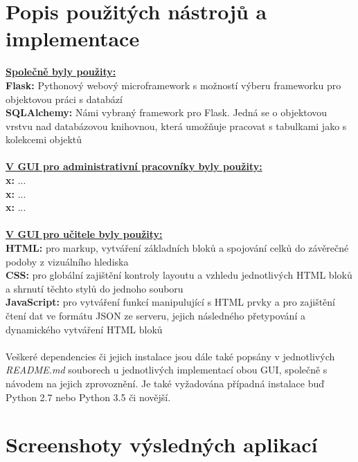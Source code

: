 \documentclass[a4paper, 11pt, twocolumn]{article}
\begin{document}
	\vspace*{\fill}
	\clearpage


	\section*{\large{Popis použitých nástrojů a implementace}}
	\vspace*{-0.2cm}
	\vspace*{0.3cm}
	\noindent\textbf{\underline{Společně byly použity: }} \\
	\noindent\textbf{Flask: } Pythonový webový microframework s možností výberu frameworku pro objektovou práci s databází \\
	\noindent\textbf{SQLAlchemy: } Námi vybraný framework pro Flask. Jedná se o objektovou vrstvu nad databázovou knihovnou, která umožňuje pracovat s 
	tabulkami jako s kolekcemi objektů \\
	\vspace*{0.5cm} \\
	\noindent\textbf{\underline{V GUI pro administrativní pracovníky byly použity: }} \\
	\noindent\textbf{x: } ... \\
	\noindent\textbf{x: } ... \\
	\noindent\textbf{x: } ... \\
	\vspace*{0.5cm} \\
	\noindent\textbf{\underline{V GUI pro učitele byly použity: }} \\
	\noindent\textbf{HTML: } pro markup, vytváření základních bloků a spojování celků do závěrečné podoby z vizuálního hlediska \\
	\noindent\textbf{CSS: } pro globální zajištění kontroly layoutu a vzhledu jednotlivých HTML bloků a shrnutí těchto stylů do jednoho souboru \\
	\noindent\textbf{JavaScript: } pro vytváření funkcí manipulující s HTML prvky a pro zajištění čtení dat ve formátu JSON ze serveru, jejich následného 
	přetypování a dynamického vytváření HTML bloků \\
	\vspace*{0.5cm} \\
	\noindent Veškeré dependencies či jejich instalace jsou dále také popsány v jednotlivých \textit{README.md} souborech u jednotlivých implementací obou 
	GUI, společně s návodem na jejich zprovoznění. Je také vyžadována případná instalace buď Python 2.7 nebo Python 3.5 či novější. \\
	

	\vspace*{\fill}
	\clearpage


	\section*{\large{Screenshoty výsledných aplikací}}
	\vspace*{-0.2cm}
	
\end{document}
